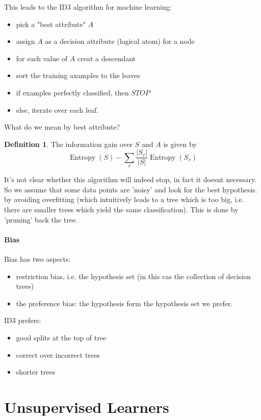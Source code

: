 \documentclass{book}
\theoremstyle{plain}
\theoremstyle{definition}
\newtheorem{definition}[corollary]{Definition}
\DeclareMathOperator{\Entropy}{Entropy}
\begin{document}
This leads to the ID3 algorithm for machine learning:

\begin{itemize}
\item pick a "best attribute" $A$
\item assign $A$ as a decision attribute (logical atom) for a node
\item for each value of $A$ creat a descendant
\item sort the training axamples to the leaves
\item if examples perfectly classified, then $STOP$
\item else, iterate over each leaf.	
\end{itemize}


What do we mean by best attribute?

\begin{definition}
The information gain over $S$ and $A$ is given by
\[
\Entropy(S)-\sum_v \frac{\vert S_v\vert }{\vert S\vert }\Entropy(S_v)
\]	

\end{definition}

It's not clear whether this algorithm will indeed stop, in fact it doesnt necessary. So we assume that some data points are 'noisy' and look for the best hypothesis. by avoiding overfitting (which intuitively leads to a tree which is too big, i.e. there are smaller trees which yield the same classification). This is done by 'pruning' back the tree.

\subsection{Bias}
Bias has two aspects:
\begin{itemize}
\item restriction bias, i.e. the hypothesis set (in this cas the collection of decision trees)
\item the preference bias: the hypothesis form the hypothesis set we prefer.	
\end{itemize}

ID3 prefers:
\begin{itemize}
\item good splits at the top of tree
\item correct over incorrect trees
\item shorter trees	
\end{itemize}


\part{Unsupervised Learners}
\end{document}

